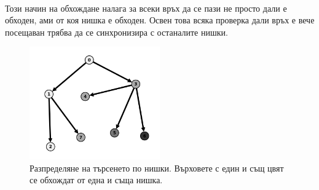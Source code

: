 \paragraph*{} Този начин на обхождане налага за всеки връх да се пази не просто дали е обходен, ами от коя нишка е обходен. Освен това всяка проверка дали връх е вече посещаван трябва да се синхронизира с останалите нишки.

\begin{figure}[h]
  \centering
  \includegraphics[width=0.5\textwidth]{resources/algorithm.png}
  \caption{\label{fig:algorithm} Разпределяне на търсенето по нишки. Върховете с един и същ цвят се обхождат от една и съща нишка.}
\end{figure}
